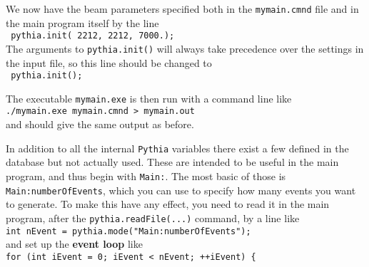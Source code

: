 \documentclass[12pt,a4paper]{article}
\begin{document}
We now have the beam parameters specified both in the \texttt{mymain.cmnd}
file and in the main program itself by the line \\
\hspace*{10mm}\texttt{ pythia.init( 2212, 2212, 7000.); } \\
The arguments to \texttt{pythia.init()} will always take precedence over
the settings in the input file, so this line should be changed to \\
\hspace*{10mm}\texttt{ pythia.init(); } 

The executable \texttt{mymain.exe} is then run with a command line like\\
\hspace*{10mm}\texttt{./mymain.exe mymain.cmnd > mymain.out}\\
and should give the same output as before.

In addition to all the internal \texttt{Pythia} variables there exist a
few defined in the database but not actually used. These are intended to 
be useful in the main program, and thus begin with \texttt{Main:}.
The most basic of those is \texttt{Main:numberOfEvents}, which you can 
use to specify how many events you want to generate. To make this have
any effect, you need to read it in the main program, after
the \texttt{pythia.readFile(...)} command, by a line like\\
\hspace*{10mm}\texttt{int nEvent = pythia.mode("Main:numberOfEvents");}\\
and set up the \textbf{event loop} like\\
\hspace*{10mm}\texttt{for (int iEvent = 0; iEvent < nEvent; ++iEvent) \{ }
\end{document}

